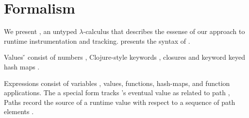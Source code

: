 \chapter{Formalism}

We present \lambdatrack{}, an untyped $\lambda$-calculus
that describes the essense of our approach to runtime instrumentation
and tracking.
 presents the syntax of \lambdatrack{}.

Values \v{} consist of numbers \num{}, Clojure-style keywords {\kw{}},
closures {\closure{\uabs{\x{}}{\e{}}}{\openv{}}}
and keyword keyed hash maps {\curlymapvaloverrightnoarrow{\kw{}}{\val{}}}.

Expressions \e{} consist of variables \x{}, values,
functions, hash-maps, and function applications.
The a special form
\trackE{\e{}}{\inferpath{}}
tracks {\e{}}'s eventual value as related to path {\inferpath{}},
Paths \inferpath{} 
record the source of a runtime value with respect
to a sequence of path elements \pth{}.

